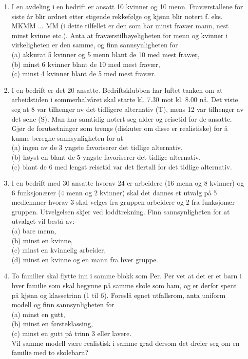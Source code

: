 \begin{enumerate}
\item  I en avdeling i en bedrift er ansatt 10 kvinner og 10 menn.
     Fraværstallene for siste år blir ordnet etter stigende
     rekkefølge og kjønn blir notert f. eks. MKMM ... MM (i dette
     tilfellet er den som har minst fravær mann, nest minst
     kvinne etc.). Anta at fraværstilbøyeligheten for menn og
     kvinner i virkeligheten er den samme, og finn
     sannsynligheten for \\
     (a)  akkurat 5 kvinner og 5 menn blant de 10 med mest     
          fravær,\\
     (b)  minst 6 kvinner blant de 10 med mest fravær,\\
     (c)  minst 4 kvinner blant de 5 med mest fravær.

\item  I en bedrift er det 20 ansatte. Bedriftsklubben har luftet
     tanken om at arbeidstiden i sommerhalvåret skal starte kl.
     7.30 mot kl. 8.00 nå. Det viste seg at 8 var tilhenger av
     det tidligere alternativ (T), mens 12 var tilhenger av det
     sene (S). Man har samtidig notert seg alder og reisetid for
     de ansatte. Gjør de forutsetninger som trengs (diskuter om
     disse er realistiske) for å kunne beregne sannsynligheten
     for at\\
     (a)  ingen av de 3 yngste favoriserer det tidlige          
          alternativ,\\
     (b)  høyst en blant de 5 yngste favoriserer det tidlige     
          alternativ,\\
     (c)  blant de 6 med lengst reisetid var det flertall for det
          tidlige alternativ.

\item I en bedrift med 30 ansatte hvorav 24 er arbeidere (16 menn
     og 8 kvinner) og 6 funksjonærer (4 menn og 2 kvinner) skal
     det dannes et utvalg på 5 medlemmer hvorav 3 skal velges fra
     gruppen arbeidere og 2 fra funksjonær gruppen. Utvelgelsen
     skjer ved loddtrekning. Finn sannsynligheten for at utvalget
     vil bestå av:\\
     (a)  bare menn,\\
     (b)  minst en kvinne,\\
     (c)  minst en kvinnelig arbeider,\\
     (d)  minst en kvinne og en mann fra hver gruppe.

\item  To familier skal flytte inn i samme blokk som Per. Per vet
     at det er et barn i hver familie som skal begynne på samme
     skole som ham, og er derfor spent på kjønn og klassetrinn (1
     til 6). Foreslå egnet utfallsrom, anta uniform modell og
     finn sannsynligheten for\\
     (a)  minst en gutt,\\
     (b)  minst en førsteklassing,\\
     (c)  minst en gutt på trinn 3 eller lavere.\\
     Vil samme modell være realistisk i samme grad dersom det
     dreier seg om en familie med to skolebarn?


\end{enumerate}
